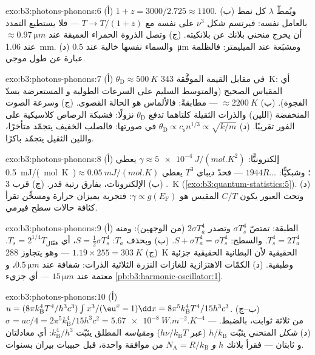 \begin{solution}{exo:b3:photons-phonons:6}
(أ) $1 + z = 3000/2.725 \approx 1100$. (ب) ويُمطّ $\lambda$ كل
نمط بالعامل نفسه: فيرتسم شكل $\nu^3$ على نفسه
مع $T \to T/(1+z)$ --- فلا يستطيع التمدد أن يخرج منحني بلانك عن
بلانكيته. (ج) وتصل الذروة الحمراء العميقة عند $\approx\qty{0.97}{\micro m}$
عند \qty{1.06}{mm}. (د) والسماء نفسها خالية عند
\qty{0.5}{\micro m} ومشبَعة عند الميليمتر: فالظلمة عبارة عن
طول موجي.
\end{solution}

\begin{solution}{exo:b3:photons-phonons:7}
(أ) $\theta_{\text{D}} \approx \qty{500}{K}$ في مقابل القيمة الموفَّقة
\qty{343}{K}: أي المقياس الصحيح (والمتوسط السليم على السرعات الطولية و
المستعرضة يسدّ الفجوة). (ب) $\approx\qty{2200}{K}$ ---
مطابقةً: فالألماس هو الحالة القصوى. (ج) وسرعة الصوت المنخفضة (اللين)
والذرات الثقيلة كلتاهما تدفع $\theta_{\text{D}}$ نزولًا: فشبكة الرصاص
كلاسيكية على الفور تقريبًا. (د) $\theta_{\text{D}} \propto
c_{\text{s}}n^{1/3} \propto \sqrt{k/m}$ في صورتها: فالصلب الخفيف
يتجمّد متأخرًا، واللين الثقيل يتجمّد باكرًا.
\end{solution}

\begin{solution}{exo:b3:photons-phonons:8}
(أ) إلكترونيًّا: $\gamma \approx \qty{5e-4}{J/(mol.K^2)}$ يعطي
\qty{0.5}{mJ/(mol.K)}؛ وشبكيًّا: $1944R\dots$ --- فحدّ ديباي $T^3$
يعطي $\approx\qty{0.05}{mJ/(mol.K)}$. (ب) الإلكترونات، بفارق
رتبة قدر. (ج) قرب \qty{3}{K}
(\cref{exo:b3:quantum-statistics:5}). (د) وتحت العبور يكون
 $C/T$ المقيس هو $\gamma \propto g(E_{\text{F}})$: فتجربة
بميزان حرارة ومسخِّن تقرأ كثافة حالات سطح فيرمي.
\end{solution}

\begin{solution}{exo:b3:photons-phonons:9}
(أ) الطبقة: تمتصّ $\sigma T_s^4$ وتصدر $2\sigma T_a^4$ (من
الوجهين): ومنه $T_s^4 = 2T_a^4$. والسطح: $S + \sigma T_a^4 = \sigma
T_s^4$. (ب) وبحذف $T_a$: $S = \tfrac12\sigma T_s^4$، أي
$T_s = 2^{1/4}T_{\text{فعّال}}$. (ج) $1.19 \times 255 =
\qty{303}{K}$ --- وهو يتجاوز \qty{288}{K} الحقيقية لأن
البطانية الحقيقية جزئية وطبقية. (د) الكمّات الاهتزازية
للغازات النزرة الثلاثية الذرات: شفافة عند $0.5\,\unit{\micro m}$، و
معتمة عند $15\,\unit{\micro m}$ ---
أي جزيء \cref{pb:b3:harmonic-oscillator:1}.
\end{solution}

\begin{solution}{exo:b3:photons-phonons:10}
(أ) $u = (8\pi k_{\text{B}}^4T^4/h^3c^3)\int x^3/(\eu^x - 1)\dd x
= 8\pi^5k_{\text{B}}^4T^4/15h^3c^3$. (ب--ج) $\sigma = ac/4 =
2\pi^5k_{\text{B}}^4/15h^3c^2 = \qty{5.67e-8}{W.m^{-2}.K^{-4}}$
--- من ثلاثة ثوابت، بالضبط. (د) \emph{شكل} المنحني
يثبّت $h/k_{\text{B}}$ (عبر $h\nu/k_{\text{B}}T$) و\emph{مقياسه}
المطلق يثبّت $k_{\text{B}}^4/h^3$: أي معادلتان و
ثابتان --- فقرأ بلانك $h$ \emph{و} $N_{\text{A}} =
R/k_{\text{B}}$ من موافقة واحدة، قبل حبيبات بيران بسنوات.
\end{solution}

